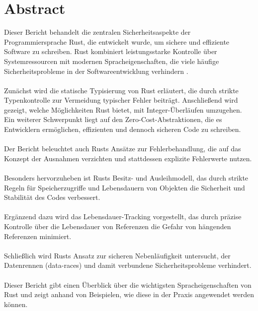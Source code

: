 \section*{Abstract}
\label{sec:abstract}

Dieser Bericht behandelt die zentralen Sicherheitsaspekte der Programmiersprache Rust, die entwickelt wurde, um sichere und effiziente Software zu schreiben. 
Rust kombiniert leistungsstarke Kontrolle über Systemressourcen mit modernen Spracheigenschaften, die viele häufige Sicherheitsprobleme in der Softwareentwicklung verhindern \cite{RustDoc2024}.\\
\\
Zunächst wird die statische Typisierung von Rust erläutert, die durch strikte Typenkontrolle zur Vermeidung typischer Fehler beiträgt. 
Anschließend wird gezeigt, welche Möglichkeiten Rust bietet, mit Integer-Überläufen umzugehen. 
Ein weiterer Schwerpunkt liegt auf den Zero-Cost-Abstraktionen, die es Entwicklern ermöglichen, effizienten und dennoch sicheren Code zu schreiben.\\
\\
Der Bericht beleuchtet auch Rusts Ansätze zur Fehlerbehandlung, die auf das Konzept der Ausnahmen verzichten und stattdessen explizite Fehlerwerte nutzen.\\
\\
Besonders hervorzuheben ist Rusts Besitz- und Ausleihmodell, das durch strikte Regeln für Speicherzugriffe und Lebensdauern von Objekten die Sicherheit und Stabilität des Codes verbessert. \\
\\
Ergänzend dazu wird das Lebensdauer-Tracking vorgestellt, das durch präzise Kontrolle über die Lebensdauer von Referenzen die Gefahr von hängenden Referenzen minimiert.\\
\\
Schließlich wird Rusts Ansatz zur sicheren Nebenläufigkeit untersucht, der Datenrennen (\glspl{data-race}) und damit verbundene Sicherheitsprobleme verhindert. \\
\\
Dieser Bericht gibt einen Überblick über die wichtigsten Spracheigenschaften von Rust und zeigt anhand von Beispielen, wie diese in der Praxis angewendet werden können.
